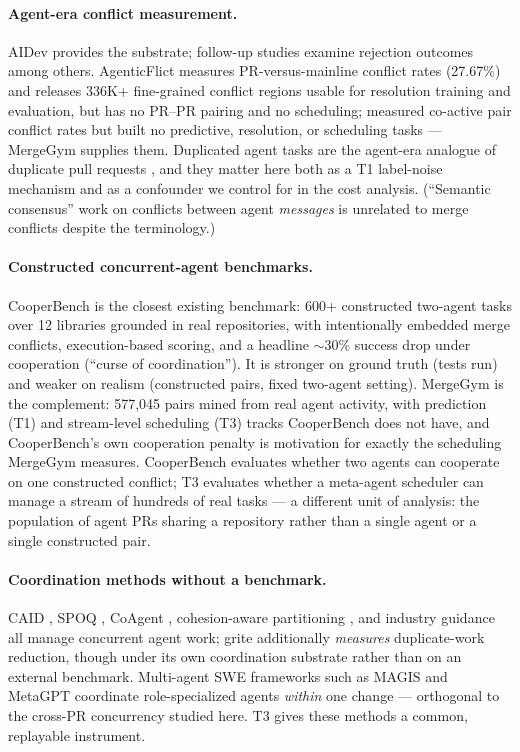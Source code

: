 \documentclass{article}
\begin{document}
\paragraph{Agent-era conflict measurement.} AIDev \citep{li2026aidev,li2025rise} provides the substrate; follow-up studies examine rejection outcomes \citep{rejection2026} among others. AgenticFlict \citep{ogenrwot2026agenticflict} measures PR-versus-mainline conflict rates (27.67\%) and releases 336K+ fine-grained conflict regions usable for resolution training and evaluation, but has no PR--PR pairing and no scheduling; \citet{xu2026agentprs} measured co-active pair conflict rates but built no predictive, resolution, or scheduling tasks --- MergeGym supplies them. Duplicated agent tasks are the agent-era analogue of duplicate pull requests \citep{yu2018duppr}, and they matter here both as a T1 label-noise mechanism and as a confounder we control for in the cost analysis. (``Semantic consensus'' work on conflicts between agent \emph{messages} \citep{semcons2026} is unrelated to merge conflicts despite the terminology.)

\paragraph{Constructed concurrent-agent benchmarks.} CooperBench \citep{khatua2026cooperbench} is the closest existing benchmark: 600+ constructed two-agent tasks over 12 libraries grounded in real repositories, with intentionally embedded merge conflicts, execution-based scoring, and a headline $\sim$30\% success drop under cooperation (``curse of coordination''). %
It is stronger on ground truth (tests run) and weaker on realism (constructed pairs, fixed two-agent setting). MergeGym is the complement: 577{,}045 pairs mined from real agent activity, with prediction (T1) and stream-level scheduling (T3) tracks CooperBench does not have, and CooperBench's own cooperation penalty is motivation for exactly the scheduling MergeGym measures. CooperBench evaluates whether two agents can cooperate on one constructed conflict; T3 evaluates whether a meta-agent scheduler can manage a stream of hundreds of real tasks --- a different unit of analysis: the population of agent PRs sharing a repository rather than a single agent or a single constructed pair.

\paragraph{Coordination methods without a benchmark.} CAID \citep{geng2026caid}, SPOQ \citep{spoq2026}, CoAgent \citep{coagent2026}, cohesion-aware partitioning \citep{cohesion2026}, and industry guidance \citep{cognition2025dont} all manage concurrent agent work; grite \citep{sarkar2026grite} additionally \emph{measures} duplicate-work reduction, though under its own coordination substrate rather than on an external benchmark. Multi-agent SWE frameworks such as MAGIS \citep{tao2024magis} and MetaGPT \citep{hong2024metagpt} coordinate role-specialized agents \emph{within} one change --- orthogonal to the cross-PR concurrency studied here. T3 gives these methods a common, replayable instrument.
\end{document}
